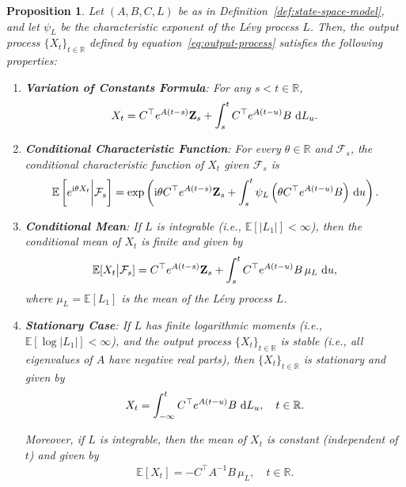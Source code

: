 \documentclass[10pt,a4paper,reqno]{amsart}
\newtheorem{proposition}[theorem]{Proposition}
\theoremstyle{example}
\newcommand*\D{\mathop{}\!\textnormal{d}}
\newcommand*\I{\mathop{}\!\textnormal{i}}
\begin{document}
\begin{proposition}\label{prop:output-process-properties}
Let $(A, B, C, L)$ be as in Definition~\ref{def:state-space-model}, and let $\psi_L$ be the characteristic exponent of the L\'evy process $L$. Then, the output process $\{X_t\}_{t \in \mathbb{R}}$ defined by equation~\eqref{eq:output-process} satisfies the following properties:

\begin{enumerate}
    \item \textbf{Variation of Constants Formula}: For any $s < t \in \mathbb{R}$,
    \begin{align}\label{eq:X-variation-of-constants}
    X_t = C^\top e^{A (t - s)} \mathbf{Z}_s + \int_s^t C^\top e^{A (t - u)} B \, \D L_u.
    \end{align}
    
    \item \textbf{Conditional Characteristic Function}: For every $\theta \in \mathbb{R}$ and $\mathcal{F}_s$, the conditional characteristic function of $X_t$ given $\mathcal{F}_s$ is
    \begin{align}\label{eq:X-characteristic-function}
    \mathbb{E}\left[ e^{\I \theta X_t} \bigg| \mathcal{F}_s \right] = \exp\left( \I \theta C^\top e^{A (t - s)} \mathbf{Z}_s + \int_s^t \psi_L\left( \theta C^\top e^{A (t - u)} B \right) \, \D u \right).
    \end{align}
    
    \item \textbf{Conditional Mean}: If $L$ is integrable (i.e., $\mathbb{E}[ |L_1| ] < \infty$), then the conditional mean of $X_t$ is finite and given by
    \begin{align}\label{eq:X-mean}
    \mathbb{E}[ X_t \big| \mathcal{F}_s ] = C^\top e^{A (t - s)} \mathbf{Z}_s + \int_s^t C^\top e^{A (t - u)} B \, \mu_L \, \D u,
    \end{align}
    where $\mu_L = \mathbb{E}[ L_1 ]$ is the mean of the L\'evy process $L$.
    
    \item \textbf{Stationary Case}: If $L$ has finite logarithmic moments (i.e., $\mathbb{E}[ \log | L_1 | ] < \infty$), and the output process $\{X_t\}_{t \in \mathbb{R}}$ is stable (i.e., all eigenvalues of $A$ have negative real parts), then $\{X_t\}_{t \in \mathbb{R}}$ is stationary and given by
    \begin{align}\label{eq:X-stationary}
    X_t = \int_{-\infty}^t C^\top e^{A (t - u)} B \, \D L_u, \quad t \in \mathbb{R}.
    \end{align}
    
    Moreover, if $L$ is integrable, then the mean of $X_t$ is constant (independent of $t$) and given by
    \begin{align}\label{eq:X-mean-stationary}
    \mathbb{E}[ X_t ] = - C^\top A^{-1} B \, \mu_L, \quad t \in \mathbb{R}.
    \end{align}
\end{enumerate}
\end{proposition}
\end{document}
